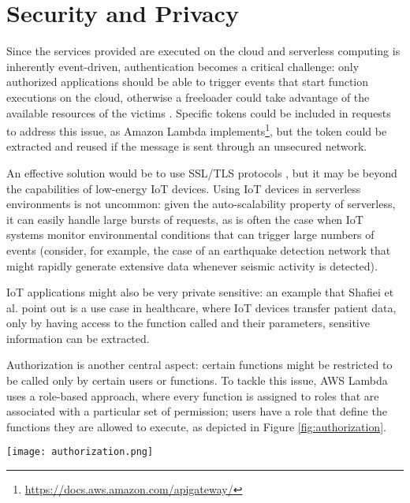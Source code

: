 \documentclass[
	a4paper, %
	12pt,
	twoside, %
]{LTJournalArticle}
\begin{document}
\section{Security and Privacy}
Since the services provided are executed on the cloud and serverless computing is inherently event-driven, authentication becomes a critical challenge: only authorized applications should be able to trigger events that start function executions on the cloud, otherwise a freeloader could take advantage of the available resources of the victims \cite{shafiei_serverless_2022}. Specific tokens could be included in requests to address this issue, as Amazon Lambda implements\footnote{\url{https://docs.aws.amazon.com/apigateway/}}, but the token could be extracted and reused if the message is sent through an unsecured network. 

An effective solution would be to use SSL/TLS protocols \cite{freier_secure_2011, rescorla_transport_2018}, but it may be beyond the capabilities of low-energy IoT devices. Using IoT devices in serverless environments is not uncommon: given the auto-scalability property of serverless, it can easily handle large bursts of requests, as is often the case when IoT systems monitor environmental conditions that can trigger large numbers of events (consider, for example, the case of an earthquake detection network that might rapidly generate extensive data whenever seismic activity is detected).

IoT applications might also be very private sensitive: an example that Shafiei et al. \cite{shafiei_serverless_2022} point out is a use case in healthcare, where IoT devices transfer patient data, only by having access to the function called and their parameters, sensitive information can be extracted. 

Authorization is another central aspect: certain functions might be restricted to be called only by certain users or functions. To tackle this issue, AWS Lambda uses a role-based approach, where every function is assigned to roles that are associated with a particular set of permission; users have a role that define the functions they are allowed to execute, as depicted in Figure \ref{fig:authorization}. 

\begin{figure*}[!htb]
	\texttt{[image: authorization.png]}
	\caption{Authorization mechanism in serverless paradigm. Source: \cite{castro_rise_2019}}
	\label{fig:authorization}
\end{figure*}
\end{document}
